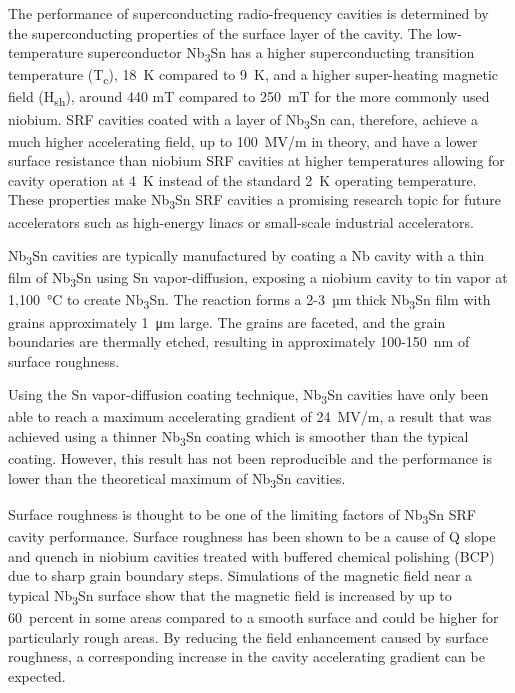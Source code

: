 \documentclass[reprint,amsmath,amssymb,aps]{revtex4-2}%
\begin{document}
The performance of superconducting radio-frequency cavities is determined by the superconducting properties of the surface layer of the cavity. The low-temperature superconductor Nb\textsubscript{3}Sn has a higher superconducting transition temperature (T\textsubscript{c}), 18~K compared to 9~K, and a higher super-heating magnetic field (H\textsubscript{sh}), around 440 mT compared to 250~mT for the more commonly used niobium\cite{liarte2017theoretical, catelani2008temperature, lin2012effect, kubo2020superfluid}. SRF cavities coated with a layer of Nb\textsubscript{3}Sn can, therefore, achieve a much higher accelerating field, up to 100~MV/m in theory, and have a lower surface resistance than niobium SRF cavities at higher temperatures allowing for cavity operation at 4~K instead of the standard 2~K operating temperature. These properties make Nb\textsubscript{3}Sn SRF cavities a promising research topic for future accelerators such as high-energy linacs or small-scale industrial accelerators.

Nb\textsubscript{3}Sn cavities are typically manufactured by coating a Nb cavity with a thin film of Nb\textsubscript{3}Sn using Sn vapor-diffusion, exposing a niobium cavity to tin vapor at 1,100~°C to create Nb\textsubscript{3}Sn. The reaction forms a 2-3~µm thick Nb\textsubscript{3}Sn film with grains approximately 1~\si{\micro\meter} large. The grains are faceted, and the grain boundaries are thermally etched, resulting in approximately 100-150~nm of surface roughness. 

Using the Sn vapor-diffusion coating technique, Nb\textsubscript{3}Sn cavities have only been able to reach a maximum accelerating gradient of 24~MV/m\cite{posen2021advances}, a result that was achieved using a thinner Nb\textsubscript{3}Sn coating which is smoother than the typical coating. However, this result has not been reproducible and the performance is lower than the theoretical maximum of Nb\textsubscript{3}Sn cavities.

Surface roughness is thought to be one of the limiting factors of Nb\textsubscript{3}Sn SRF cavity performance. Surface roughness has been shown to be a cause of Q slope and quench in niobium cavities treated with buffered chemical polishing (BCP) due to sharp grain boundary steps.\cite{knobloch1999high, xu2016simulation} Simulations of the magnetic field near a typical Nb\textsubscript{3}Sn surface show that the magnetic field is increased by up to 60~percent in some areas compared to a smooth surface\cite{porter2016surface, kubo2015magnetic} and could be higher for particularly rough areas. By reducing the field enhancement caused by surface roughness, a corresponding increase in the cavity accelerating gradient can be expected. 
\end{document}
